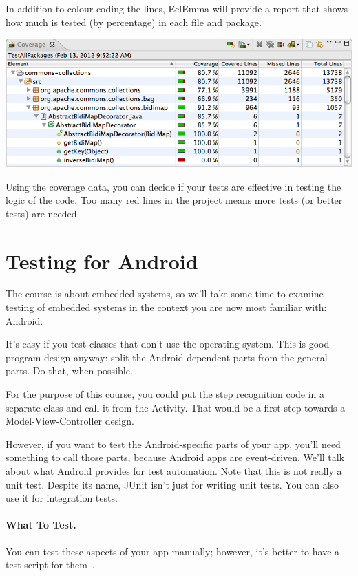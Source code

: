 In addition to colour-coding the lines, EclEmma will provide a report that shows how much is tested (by percentage) in each file and package.

\begin{center}
	\includegraphics[width=\textwidth]{images/coverageview.png}
\end{center}

Using the coverage data, you can decide if your tests are effective in testing the logic of the code. Too many red lines in the project means more tests (or better tests) are needed.

\section*{Testing for Android}


The course is about embedded systems, so we'll take some time to examine testing of embedded systems in the context you are now most familiar with: Android.


It's easy if you
test classes that don't use the operating system.  This is good program design
anyway: split the Android-dependent parts from the general parts. Do
that, when possible. 

For the purpose of this course, you could put the step recognition
code in a separate class and call it from the Activity. That would be
a first step towards a Model-View-Controller design.

However, if you want to test the Android-specific parts of your app,
you'll need something to call those parts, because Android apps are
event-driven. We'll talk about what Android provides for test automation.
Note that this is not really a unit test. Despite its name, JUnit isn't just
for writing unit tests. You can also use it for integration tests.

\paragraph{What To Test.}
You can test these aspects of your app manually; however, it's better to have a test
script for them~\cite{android:testwhat}.

